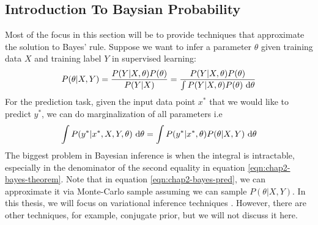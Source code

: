 \label{sec:chap2-prob-ml}

\subsection{Introduction To Baysian Probability}
\label{sec:chap2-intro-baysian}
Most of the focus in this section will be to provide techniques that approximate the solution to Bayes' rule. Suppose we want to infer a parameter $\theta$ given training data $X$ and training label $Y$ in supervised learning: 
\begin{equation}
    \label{eqn:chap2-bayes-theorem}
    P(\theta | X, Y) = \frac{P(Y | X, \theta) P(\theta)}{P(Y | X)} = \frac{P(Y | X, \theta) P(\theta)}{\int P(Y | X, \theta) P(\theta ) \ \mathrm{d} \theta}
\end{equation}
For the prediction task, given the input data point $x^*$ that we would like to predict $y^*$, we can do marginalization of all parameters i.e
\begin{equation}
    \label{eqn:chap2-bayes-pred}
    \int P(y^* | x^*, X, Y, \theta) \ \mathrm{d}\theta = \int P(y^* | x^*, \theta) P(\theta | X, Y) \ \mathrm{d}\theta
\end{equation}
The biggest problem in Bayesian inference is when the integral is intractable, especially in the denominator of the second equality in equation \ref{eqn:chap2-bayes-theorem}. Note that in equation \ref{eqn:chap2-bayes-pred}, we can approximate it via Monte-Carlo sample assuming we can sample $P(\theta | X, Y)$. In this thesis, we will focus on variational inference techniques \cite{jordan1999introduction}. However, there are other techniques, for example, conjugate prior, but we will not discuss it here.

